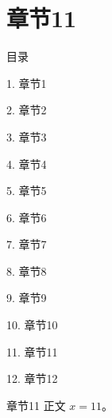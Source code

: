 \documentclass[aspectratio=169,10pt,fontset=fandol]{ctexbeamer}
\begin{document}
\section{章节11}
\begin{frame}[t,fragile]{目录}
\small
{\color{black}\small 1. 章节1\par}\vspace{0.22em}
{\color{black}\small 2. 章节2\par}\vspace{0.22em}
{\color{black}\small 3. 章节3\par}\vspace{0.22em}
{\color{black}\small 4. 章节4\par}\vspace{0.22em}
{\color{black}\small 5. 章节5\par}\vspace{0.22em}
{\color{black}\small 6. 章节6\par}\vspace{0.22em}
{\color{black}\small 7. 章节7\par}\vspace{0.22em}
{\color{black}\small 8. 章节8\par}\vspace{0.22em}
{\color{black}\small 9. 章节9\par}\vspace{0.22em}
{\color{black}\small 10. 章节10\par}\vspace{0.22em}
{\color{blue}\small 11. 章节11\par}\vspace{0.22em}
{\color{gray!40}\small 12. 章节12\par}\vspace{0.22em}
\end{frame}
\begin{frame}[t,fragile]{章节11}
\normalsize
{\normalsize
正文 $x=11$。
}
\end{frame}
\end{document}
